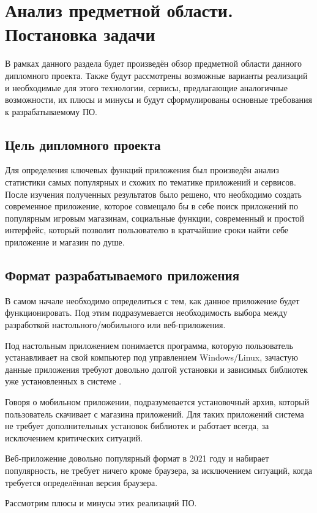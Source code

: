 \section{Анализ предметной области. Постановка задачи}
\label{sec:domain}
 
В рамках данного раздела будет произведён обзор предметной области данного дипломного проекта.
Также будут рассмотрены возможные варианты реализаций и необходимые для этого технологии, сервисы, предлагающие аналогичные возможности, их плюсы и минусы и будут сформулированы основные требования к разрабатываемому ПО.
 
\subsection{Цель дипломного проекта}
Для определения ключевых функций приложения был произведён анализ статистики самых популярных и схожих по тематике приложений и сервисов. После изучения полученных результатов было решено, что необходимо создать современное приложение, которое совмещало бы в себе поиск приложений по популярным игровым магазинам, социальные функции, современный и простой интерфейс, который позволит пользователю в кратчайшие сроки найти себе приложение и магазин по душе.

\subsection{Формат разрабатываемого приложения}
В самом начале необходимо определиться с тем, как данное приложение будет функционировать. Под этим подразумевается необходимость выбора между разработкой настольного/мобильного или веб-приложения.
 
Под настольным приложением понимается программа, которую пользователь устанавливает на свой компьютер под управлением Windows/Linux, зачастую данные приложения требуют довольно долгой установки и зависимых библиотек уже установленных в системе \cite{web1}.

Говоря о мобильном приложении, подразумевается установочный архив, который пользователь скачивает с магазина приложений. Для таких приложений система не требует дополнительных установок библиотек и работает всегда, за исключением критических ситуаций.

Веб-приложение довольно популярный формат в 2021 году и набирает популярность, не требует ничего кроме браузера, за исключением ситуаций, когда требуется определённая версия браузера.

Рассмотрим плюсы и минусы этих реализаций ПО.

